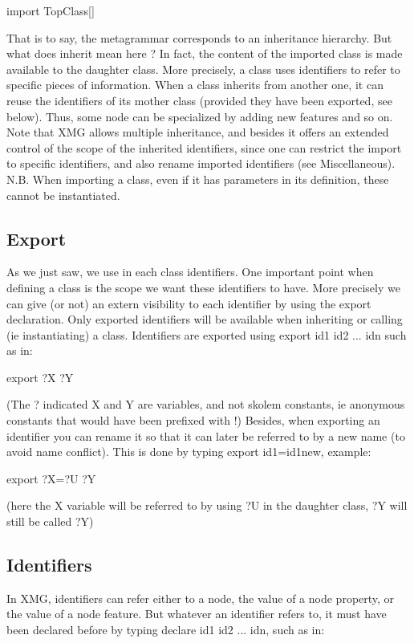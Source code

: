 \documentclass[11pt,fleqn]{book} %
\begin{document}
\begin{theorem}
import TopClass[]
\end{theorem}
That is to say, the metagrammar corresponds to an inheritance hierarchy. But what does inherit mean here ? In fact, the content of the imported class is made available to the daughter class. More precisely, a class uses identifiers to refer to specific pieces of information. When a class inherits from another one, it can reuse the identifiers of its mother class (provided they have been exported, see below). Thus, some node can be specialized by adding new features and so on.
\\
Note that XMG allows multiple inheritance, and besides it offers an extended control of the scope of the inherited identifiers, since one can restrict the import to specific identifiers, and also rename imported identifiers (see Miscellaneous).
\\
N.B. When importing a class, even if it has parameters in its definition, these cannot be instantiated.

\subsection{Export}
As we just saw, we use in each class identifiers. One important point when defining a class is the scope we want these identifiers to have. More precisely we can give (or not) an extern visibility to each identifier by using the export declaration. Only exported identifiers will be available when inheriting or calling (ie instantiating) a class. Identifiers are exported using export id1 id2 ... idn such as in:

\begin{theorem}
export ?X ?Y
\end{theorem}
(The ? indicated X and Y are variables, and not skolem constants, ie anonymous constants that would have been prefixed with !) Besides, when exporting an identifier you can rename it so that it can later be referred to by a new name (to avoid name conflict). This is done by typing export id1=id1new, example:

\begin{theorem}
export ?X=?U ?Y
\end{theorem}
(here the X variable will be referred to by using ?U in the daughter class, ?Y will still be called ?Y)

\subsection{Identifiers}
In XMG, identifiers can refer either to a node, the value of a node property, or the value of a node feature. But whatever an identifier refers to, it must have been declared before by typing declare id1 id2 ... idn, such as in:
\end{document}
